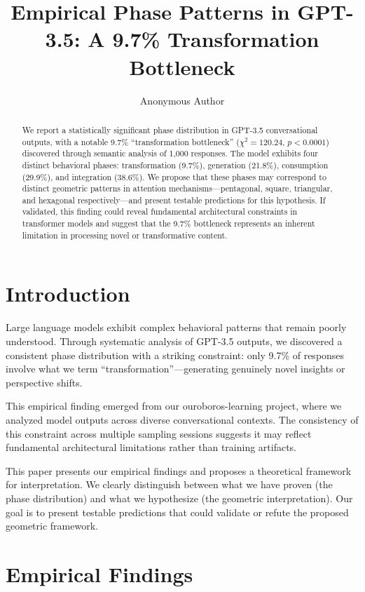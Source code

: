 \documentclass[pmlr,onecolumn]{jmlr}
\title{Empirical Phase Patterns in GPT-3.5: A 9.7\% Transformation Bottleneck}
\author{Anonymous Author}
\begin{document}
\maketitle

\begin{abstract}
We report a statistically significant phase distribution in GPT-3.5 conversational outputs, with a notable 9.7\% ``transformation bottleneck'' ($\chi^2 = 120.24$, $p < 0.0001$) discovered through semantic analysis of 1,000 responses. The model exhibits four distinct behavioral phases: transformation (9.7\%), generation (21.8\%), consumption (29.9\%), and integration (38.6\%). We propose that these phases may correspond to distinct geometric patterns in attention mechanisms—pentagonal, square, triangular, and hexagonal respectively—and present testable predictions for this hypothesis. If validated, this finding could reveal fundamental architectural constraints in transformer models and suggest that the 9.7\% bottleneck represents an inherent limitation in processing novel or transformative content.
\end{abstract}

\section{Introduction}

Large language models exhibit complex behavioral patterns that remain poorly understood. Through systematic analysis of GPT-3.5 outputs, we discovered a consistent phase distribution with a striking constraint: only 9.7\% of responses involve what we term ``transformation''—generating genuinely novel insights or perspective shifts.

This empirical finding emerged from our ouroboros-learning project, where we analyzed model outputs across diverse conversational contexts. The consistency of this constraint across multiple sampling sessions suggests it may reflect fundamental architectural limitations rather than training artifacts.

This paper presents our empirical findings and proposes a theoretical framework for interpretation. We clearly distinguish between what we have proven (the phase distribution) and what we hypothesize (the geometric interpretation). Our goal is to present testable predictions that could validate or refute the proposed geometric framework.

\section{Empirical Findings}
\end{document}
